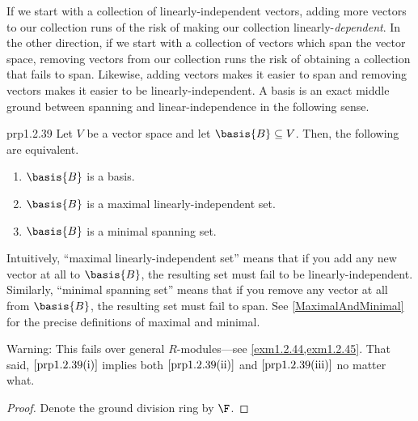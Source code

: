 If we start with a collection of linearly-independent vectors, adding more vectors to our collection runs of the risk of making our collection linearly-\emph{dependent}.  In the other direction, if we start with a collection of vectors which span the vector space, removing vectors from our collection runs the risk of obtaining a collection that fails to span.  Likewise, adding vectors makes it easier to span and removing vectors makes it easier to be linearly-independent.  A basis is an exact middle ground between spanning and linear-independence in the following sense.
\begin{prp}{}{prp1.2.39}
	Let $V$ be a vector space and let $\basis{B}\subseteq V$.  Then, the following are equivalent.
	\begin{enumerate}
		\item \label{prp1.2.39(i)}$\basis{B}$ is a basis.
		\item \label{prp1.2.39(ii)}$\basis{B}$ is a maximal linearly-independent set.
		\item \label{prp1.2.39(iii)}$\basis{B}$ is a minimal spanning set.
	\end{enumerate}
	\begin{rmk}
		Intuitively, ``maximal linearly-independent set'' means that if you add any new vector at all to $\basis{B}$, the resulting set must fail to be linearly-independent.  Similarly, ``minimal spanning set'' means that if you remove any vector at all from $\basis{B}$, the resulting set must fail to span.  See \cref{MaximalAndMinimal} for the precise definitions of maximal and minimal.
	\end{rmk}
	\begin{rmk}
		Warning:  This fails over general $R$-modules---see \cref{exm1.2.44,exm1.2.45}.  That said, $\cref{prp1.2.39(i)}$ implies both $\cref{prp1.2.39(ii)}$ and $\cref{prp1.2.39(iii)}$ no matter what.
	\end{rmk}
	\begin{proof}
		Denote the ground division ring by $\F$.
		

\end{proof}
\end{prp}
